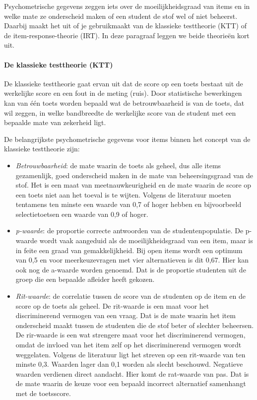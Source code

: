 \documentclass[
]{book}
\providecommand{\tightlist}{%
  \setlength{\itemsep}{0pt}\setlength{\parskip}{0pt}}
\begin{document}
Psychometrische gegevens zeggen iets over de moeilijkheidsgraad van items en in welke mate ze onderscheid maken of een student de stof wel of niet beheerst. Daarbij maakt het uit of je gebruikmaakt van de klassieke testtheorie (KTT) of de item-response-theorie (IRT). In deze paragraaf leggen we beide theorieën kort uit.

\hypertarget{de-klassieke-testtheorie-ktt}{%
\paragraph{De klassieke testtheorie (KTT)}\label{de-klassieke-testtheorie-ktt}}

De klassieke testtheorie gaat ervan uit dat de score op een toets bestaat uit de werkelijke score en een fout in de meting (ruis). Door statistische bewerkingen kan van één toets worden bepaald wat de betrouwbaarheid is van de toets, dat wil zeggen, in welke bandbreedte de werkelijke score van de student met een bepaalde mate van zekerheid ligt.

De belangrijkste psychometrische gegevens voor items binnen het concept van de klassieke testtheorie zijn:

\begin{itemize}
\tightlist
\item
  \emph{Betrouwbaarheid}: de mate waarin de toets als geheel, dus alle items gezamenlijk, goed onderscheid maken in de mate van beheersingsgraad van de stof. Het is een maat van meetnauwkeurigheid en de mate waarin de score op een toets niet aan het toeval is te wijten. Volgens de literatuur moeten tentamens ten minste een waarde van 0,7 of hoger hebben en bijvoorbeeld selectietoetsen een waarde van 0,9 of hoger.
\item
  \emph{p-waarde}: de proportie correcte antwoorden van de studentenpopulatie. De p-waarde wordt vaak aangeduid als de moeilijkheidsgraad van een item, maar is in feite een graad van gemakkelijkheid. Bij open items wordt een optimum van 0,5 en voor meerkeuzevragen met vier alternatieven is dit 0,67. Hier kan ook nog de a-waarde worden genoemd. Dat is de proportie studenten uit de groep die een bepaalde afleider heeft gekozen.
\item
  \emph{Rit-waarde}: de correlatie tussen de score van de studenten op de item en de score op de toets als geheel. De rit-waarde is een maat voor het discriminerend
  vermogen van een vraag. Dat is de mate waarin het item onderscheid maakt tussen de studenten die de stof beter of slechter beheersen. De rir-waarde is een wat strengere maat voor het discriminerend vermogen, omdat de invloed van het item zelf op het discriminerend vermogen wordt weggelaten. Volgens de literatuur ligt het streven op een rit-waarde van ten minste 0,3. Waarden lager dan 0,1 worden als slecht beschouwd. Negatieve waarden verdienen direct aandacht. Hier komt de rat-waarde van pas. Dat is de mate waarin de keuze voor een bepaald incorrect alternatief samenhangt met de toetsscore.
\end{itemize}
\end{document}
